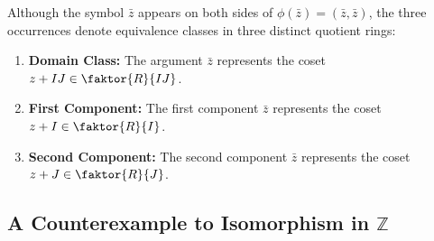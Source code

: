 \begin{content}
\begin{steps}
Although the symbol $\bar{z}$ appears on both sides of $\phi(\bar{z}) = (\bar{z}, \bar{z})$, the three occurrences denote equivalence classes in three distinct quotient rings:
\begin{enumerate}[label=\textbf{(\arabic*)}]
    \setcounter{enumi}{0} \item \textbf{Domain Class:} The argument $\bar{z}$ represents the coset $z + IJ \in \faktor{R}{IJ}$.
    \setcounter{enumi}{1} \item \textbf{First Component:} The first component $\bar{z}$ represents the coset $z + I \in \faktor{R}{I}$.
    \setcounter{enumi}{2} \item \textbf{Second Component:} The second component $\bar{z}$ represents the coset $z + J \in \faktor{R}{J}$.
\end{enumerate}
\end{steps}
\end{content}

\subsection{A Counterexample to Isomorphism in \texorpdfstring{$\mathbb{Z}$}{Z}}

